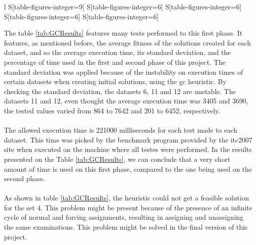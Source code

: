 \begin{table}[t]
\begin{tabular}{%
	 l%
     S[table-figures-integer=9]%
     S[table-figures-integer=6]%
     S[table-figures-integer=6]%
     S[table-figures-integer=6]%
     S[table-figures-integer=6]%
    }
\bottomrule

\end{tabular}

\caption{Some of the Graph Coloring's performance features.}
\label{tab:GCResults}

\end{table}The table \ref{tab:GCResults} features many tests performed to this first phase. It features, as mentioned before, the average fitness of the solutions created for each dataset, and so the average execution time, its standard deviation, and the percentage of time used in the first and second phase of this project. The standard deviation was applied because of the instability on execution times of certain datasets when creating initial solutions, using the \gls{gc} heuristic. By checking the standard deviation, the datasets 6, 11 and 12 are unstable. The datasets 11 and 12, even thought the average execution time was 3405 and 3690, the tested values varied from 864 to 7642 and 201 to 6452, respectively.\\
\\
The allowed execution time is 221000 milliseconds for each test made to each dataset. This time was picked by the benchmark program provided by the \gls{itc2007} site \cite{McCollum2007e} when executed on the machine where all testes were performed. In the results presented on the Table \ref{tab:GCResults}, we can conclude that a very short amount of time is used on this first phase, compared to the one being used on the second phase.\\
\\
As shown in table \ref{tab:GCResults}, the heuristic could not get a feasible solution for the set 4. This problem might be present because of the presence of an infinite cycle of normal and forcing assignments, resulting in assigning and unassigning the same examinations. This problem might be solved in the final version of this project.